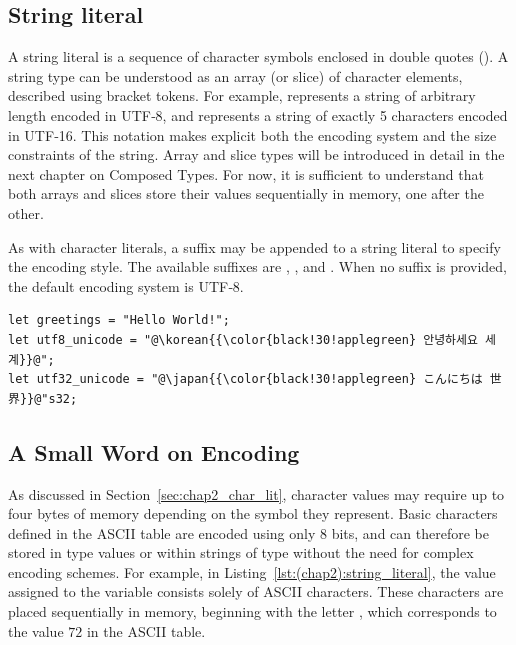 \subsection{String literal}

A string literal is a sequence of character symbols enclosed in double quotes
(). A string type can be understood as an array (or slice) of character
elements, described using bracket tokens. For example, \token{\[c8\]} represents
a string of arbitrary length encoded in UTF‑8, and \token{\[c16 ; 5\]}
represents a string of exactly 5 characters encoded in UTF‑16. This notation
makes explicit both the encoding system and the size constraints of the string.
Array and slice types will be introduced in detail in the next chapter on
Composed Types. For now, it is sufficient to understand that both arrays and
slices store their values sequentially in memory, one after the other.


As with character literals, a suffix may be appended to a string literal to
specify the encoding style. The available suffixes are , ,
and . When no suffix is provided, the default encoding system is
UTF‑8.

\begin{lstlisting}[style=coloredverbatim, label=lst:(chap2):string_literal, caption=Example of string literals, escapechar=@]
let greetings = "Hello World!";
let utf8_unicode = "@\korean{{\color{black!30!applegreen} 안녕하세요 세계}}@";
let utf32_unicode = "@\japan{{\color{black!30!applegreen} こんにちは 世界}}@"s32;
\end{lstlisting}

\subsection{A Small Word on Encoding}

As discussed in Section~\ref{sec:chap2_char_lit}, character values may require
up to four bytes of memory depending on the symbol they represent. Basic
characters defined in the ASCII table are encoded using only 8 bits, and can
therefore be stored in  type values or within strings of type
\token{[c8]} without the need for complex encoding schemes. For example, in
Listing~\ref{lst:(chap2):string_literal}, the value assigned to the variable
 consists solely of ASCII characters. These characters are
placed sequentially in memory, beginning with the letter , which
corresponds to the value $72$ in the ASCII table.

